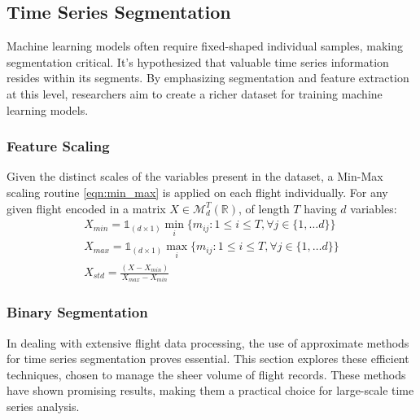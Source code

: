 \documentclass{IEEEtran}
\begin{document}
        \subsection{Time Series Segmentation} \label{sec:segmentation}

            Machine learning models often require fixed-shaped individual samples, making segmentation critical. It's hypothesized that valuable time series information resides within its segments. By emphasizing segmentation and feature extraction at this level, researchers aim to create a richer dataset for training machine learning models.

            \subsubsection{Feature Scaling}

                Given the distinct scales of the variables present in the dataset, a Min-Max scaling routine \eqref{eqn:min_max} is applied on each flight individually. For any given flight encoded in a matrix $X \in \mathcal{M}_{d}^{T}(\mathbb{R})$, of length $T$ having $d$ variables:
                \begin{equation} \label{eqn:min_max}
                    \begin{gathered}
                        X_{min} = \mathds{1}_{(d \times 1)} \min_i \{m_{ij}: 1 \leq i \leq T, \forall j \in \{1, \dots d\}\} \\
                        X_{max} = \mathds{1}_{(d \times 1)} \max_i \{m_{ij}: 1 \leq i \leq T, \forall j \in \{1, \dots d\}\} \\
                        X_{std} = \frac{(X - X_{min})}{X_{max} - X_{min}}
                    \end{gathered}
                \end{equation}

            \subsubsection{Binary Segmentation}

                In dealing with extensive flight data processing, the use of approximate methods for time series segmentation proves essential. This section explores these efficient techniques, chosen to manage the sheer volume of flight records. These methods have shown promising results, making them a practical choice for large-scale time series analysis.
\end{document}
